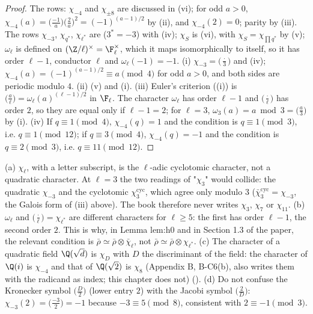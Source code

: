 \begin{proof}
The rows: $\chi_{-4}$ and $\chi_{\pm8}$ are discussed in (vi); for odd $a>0$, $\chi_{-4}(a)=\bigl(\frac{-1}a\bigr)\bigl(\frac2a\bigr)^2=(-1)^{(a-1)/2}$ by
(ii), and $\chi_{-4}(2)=0$; parity by (iii). The rows $\chi_{-3}$, $\chi_{q^*}$, $\chi_{\ell^*}$ are 
($3^*=-3$) with (iv); $\chi_S$ is (vi), with $\chi_S=\chi_{\prod q^*}$ by (v);
$\omega_\ell$ is defined on $(\Z/\ell)^\times=\F_\ell^\times$, which it maps isomorphically to itself, so it has order $\ell-1$, conductor $\ell$ and $\omega_\ell(-1)=-1$.
(i) $\chi_{-3}=\bigl(\frac\cdot3\bigr)$ and (iv); $\chi_{-4}(a)=(-1)^{(a-1)/2}\equiv a\pmod4$ for odd $a>0$, and both sides are periodic modulo $4$.
(ii) (v) and (i).
(iii) Euler's criterion ((i)) is $\bigl(\frac a\ell\bigr)=\omega_\ell(a)^{(\ell-1)/2}$ in $\F_\ell$. The character $\omega_\ell$ has order $\ell-1$ and $\bigl(\frac\cdot\ell\bigr)$ has
order $2$, so they are equal only if $\ell-1=2$; for $\ell=3$, $\omega_3(a)=a\bmod3=\bigl(\frac a3\bigr)$ by (i).
(iv) If $q\equiv1\pmod4$, $\chi_{-4}(q)=1$ and the condition is $q\equiv1\pmod3$, i.e. $q\equiv1\pmod{12}$; if $q\equiv3\pmod4$, $\chi_{-4}(q)=-1$ and the condition is
$q\equiv2\pmod3$, i.e. $q\equiv11\pmod{12}$.
\end{proof}

\begin{warning}\label{warn:rings:names}
(a) $\chi_\ell$, with a letter subscript, is the $\ell$-adic cyclotomic character, not a quadratic character. At $\ell=3$ the two readings of "$\chi_3$"
would collide: the quadratic $\chi_{-3}$ and the cyclotomic $\chi_3^{\mathrm{cyc}}$, which agree only modulo $3$ ($\bar\chi_3^{\mathrm{cyc}}=\chi_{-3}$, the Galois form of
(iii) above). The book therefore never writes $\chi_3$, $\chi_7$ or $\chi_{11}$. (b) $\omega_\ell$ and $\bigl(\frac\cdot\ell\bigr)=\chi_{\ell^*}$ are different characters for
$\ell\ge5$: the first has order $\ell-1$, the second order $2$. This is why, in Lemma lem:h0 and in Section 1.3 of the paper, the relevant condition is $\bar\rho\simeq\bar\rho\otimes\bar\chi_\ell$, not $\bar\rho\simeq\bar\rho\otimes\chi_{\ell^*}$. (c) The character of a quadratic field $\Q(\sqrt d)$ is
$\chi_D$ with $D$ the discriminant of the field: the character of $\Q(i)$ is $\chi_{-4}$ and that of $\Q(\sqrt2)$ is $\chi_8$ (Appendix B, B-C6(b), also writes
them with the radicand as index; this chapter does not) (). (d) Do not confuse the Kronecker
symbol $\bigl(\frac D2\bigr)$ (lower entry $2$) with the Jacobi symbol $\bigl(\frac2D\bigr)$: $\chi_{-3}(2)=\bigl(\frac{-3}2\bigr)=-1$ because $-3\equiv5\pmod8$, consistent with $2\equiv-1\pmod3$.
\end{warning}

